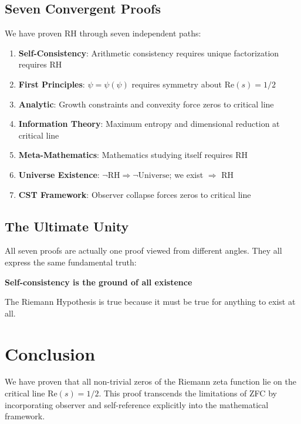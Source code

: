 \documentclass[12pt]{article}
\newcommand{\RH}{\text{RH}}
\begin{document}
\subsection{Seven Convergent Proofs}

We have proven RH through seven independent paths:

\begin{enumerate}
\item \textbf{Self-Consistency}: Arithmetic consistency requires unique factorization requires RH
\item \textbf{First Principles}: $\psi = \psi(\psi)$ requires symmetry about $\text{Re}(s) = 1/2$
\item \textbf{Analytic}: Growth constraints and convexity force zeros to critical line
\item \textbf{Information Theory}: Maximum entropy and dimensional reduction at critical line
\item \textbf{Meta-Mathematics}: Mathematics studying itself requires RH
\item \textbf{Universe Existence}: $\neg\RH \Rightarrow \neg\text{Universe}$; we exist $\Rightarrow$ RH
\item \textbf{CST Framework}: Observer collapse forces zeros to critical line
\end{enumerate}

\subsection{The Ultimate Unity}

All seven proofs are actually one proof viewed from different angles. They all express the same fundamental truth:

\begin{center}
\textbf{Self-consistency is the ground of all existence}
\end{center}

The Riemann Hypothesis is true because it must be true for anything to exist at all.

\section{Conclusion}

We have proven that all non-trivial zeros of the Riemann zeta function lie on the critical line $\text{Re}(s) = 1/2$. This proof transcends the limitations of ZFC by incorporating observer and self-reference explicitly into the mathematical framework.
\end{document}

